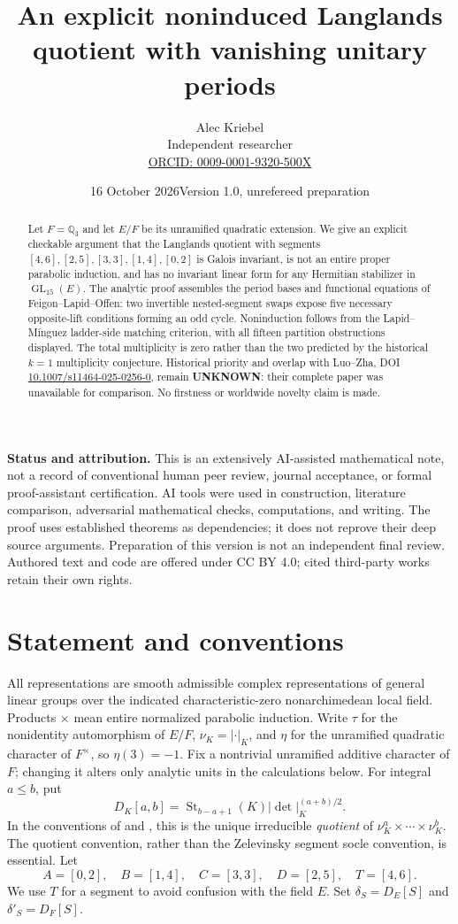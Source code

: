 \documentclass[11pt]{article}
\title{An explicit noninduced Langlands quotient with vanishing unitary periods}
\author{Alec Kriebel\\Independent researcher\\
\small\href{https://orcid.org/0009-0001-9320-500X}{ORCID: 0009-0001-9320-500X}}
\date{16 October 2026\quad Version 1.0, unrefereed preparation}
\newcommand{\GL}{\operatorname{GL}}
\newcommand{\St}{\operatorname{St}}
\newcommand{\Q}{\mathbb Q}
\begin{document}
\maketitle
\begin{abstract}
Let $F=\Q_3$ and let $E/F$ be its unramified quadratic extension. We give an explicit checkable argument that the Langlands quotient with segments
$[4,6],[2,5],[3,3],[1,4],[0,2]$ is Galois invariant, is not an entire proper parabolic induction, and has no invariant linear form for any Hermitian stabilizer in $\GL_{15}(E)$. The analytic proof assembles the period bases and functional equations of Feigon--Lapid--Offen: two invertible nested-segment swaps expose five necessary opposite-lift conditions forming an odd cycle. Noninduction follows from the Lapid--M\'inguez ladder-side matching criterion, with all fifteen partition obstructions displayed. The total multiplicity is zero rather than the two predicted by the historical $k=1$ multiplicity conjecture. Historical priority and overlap with Luo--Zha, DOI \href{https://doi.org/10.1007/s11464-025-0256-0}{10.1007/s11464-025-0256-0}, remain \textbf{UNKNOWN}: their complete paper was unavailable for comparison. No firstness or worldwide novelty claim is made.
\end{abstract}

\noindent\textbf{Status and attribution.} This is an extensively AI-assisted mathematical note, not a record of conventional human peer review, journal acceptance, or formal proof-assistant certification. AI tools were used in construction, literature comparison, adversarial mathematical checks, computations, and writing. The proof uses established theorems as dependencies; it does not reprove their deep source arguments. Preparation of this version is not an independent final review. Authored text and code are offered under CC BY 4.0; cited third-party works retain their own rights.

\section{Statement and conventions}
All representations are smooth admissible complex representations of general linear groups over the indicated characteristic-zero nonarchimedean local field. Products $\times$ mean entire normalized parabolic induction. Write $\tau$ for the nonidentity automorphism of $E/F$, $\nu_K=|\cdot|_K$, and $\eta$ for the unramified quadratic character of $F^\times$, so $\eta(3)=-1$. Fix a nontrivial unramified additive character of $F$; changing it alters only analytic units in the calculations below. For integral $a\le b$, put
\[
D_K[a,b]=\St_{b-a+1}(K)|\det|_K^{(a+b)/2}.
\]
In the conventions of \cite[\S1.5]{FLO} and \cite[\S2.3]{LM16}, this is the unique irreducible \emph{quotient} of $\nu_K^a\times\cdots\times\nu_K^b$. The quotient convention, rather than the Zelevinsky segment socle convention, is essential. Let
\[
A=[0,2],\quad B=[1,4],\quad C=[3,3],\quad D=[2,5],\quad T=[4,6].
\]
We use $T$ for a segment to avoid confusion with the field $E$. Set $\delta_S=D_E[S]$ and $\delta'_S=D_F[S]$.
\end{document}
